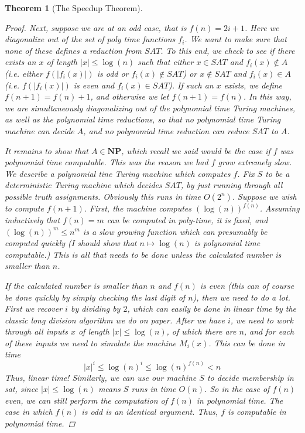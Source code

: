 \documentclass{article}
\theoremstyle{definition}
\theoremstyle{plain}
\theoremstyle{theorem}
\newtheorem{theorem}{Theorem}[section]
\begin{document}
\begin{theorem}[The Speedup Theorem]
\begin{proof}
	\par Next, suppose we are at an odd case, that is $f(n) = 2i+1$. Here we diagonalize out of the set of poly time functions $f_i$. We want to make sure that none of these defines a reduction from $SAT$. To this end, we check to see if there exists an $x$ of length $|x| \leq \log(n)$ such that either $x \in SAT$ and $f_i(x) \notin A$ (i.e. either $f(|f_i(x)|)$ is odd or $f_i(x) \notin SAT$) or $x \notin SAT$ and $f_i(x) \in A$ (i.e. $f(|f_i(x)|)$ is even and $f_i(x) \in SAT$). If such an $x$ exists, we define $f(n+1) = f(n)+1$, and otherwise we let $f(n+1) = f(n)$. In this way, we are simultaneously diagonalizing out of the polynomial time Turing machines, as well as the polynomial time reductions, so that no polynomial time Turing machine can decide $A$, and no polynomial time reduction can reduce $SAT$ to $A$. 
	\par It remains to show that $A \in \textbf{NP}$, which recall we said would be the case if $f$ was polynomial time computable. This was the reason we had $f$ grow extremely slow. We describe a polynomial tine Turing machine which computes $f$. Fix $S$ to be a deterministic Turing machine which decides $SAT$, by just running through all possible truth assignments. Obviously this runs in time $O(2^n)$. Suppose we wish to compute $f(n+1)$. First, the machine computes $(\log(n))^{f(n)}$. Assuming inductively that $f(n)=m$ can be computed in poly-time, it is fixed, and $(\log(n))^{m} \leq n^m$ is a slow growing function which can presumably be computed quickly (I should show that $n \mapsto \log(n)$ is polynomial time computable.) This is all that needs to be done unless the calculated number is smaller than $n$. 
	\par If the calculated number is smaller than $n$ and $f(n)$ is even (this can of course be done quickly by simply checking the last digit of $n$), then we need to do a lot. First we recover $i$ by dividing by $2$, which can easily be done in linear time by the classic long division algorithm we do on paper. After we have $i$, we need to work through all inputs $x$ of length $|x| \leq \log(n)$, of which there are $n$, and for each of these inputs we need to simulate the machine $M_i(x)$. This can be done in time 
	\[ |x|^i \leq \log(n)^i \leq \log(n)^{f(n)} < n \]
Thus, linear time! Similarly, we can use our machine $S$ to decide membership in sat, since $|x| \leq \log(n)$ means $S$ runs in time $O(n)$. So in the case of $f(n)$ even, we can still perform the computation of $f(n)$ in polynomial time. The case in which $f(n)$ is odd is an identical argument. Thus, $f$ is computable in polynomial time.

\end{proof}
\end{theorem}
\end{document}

